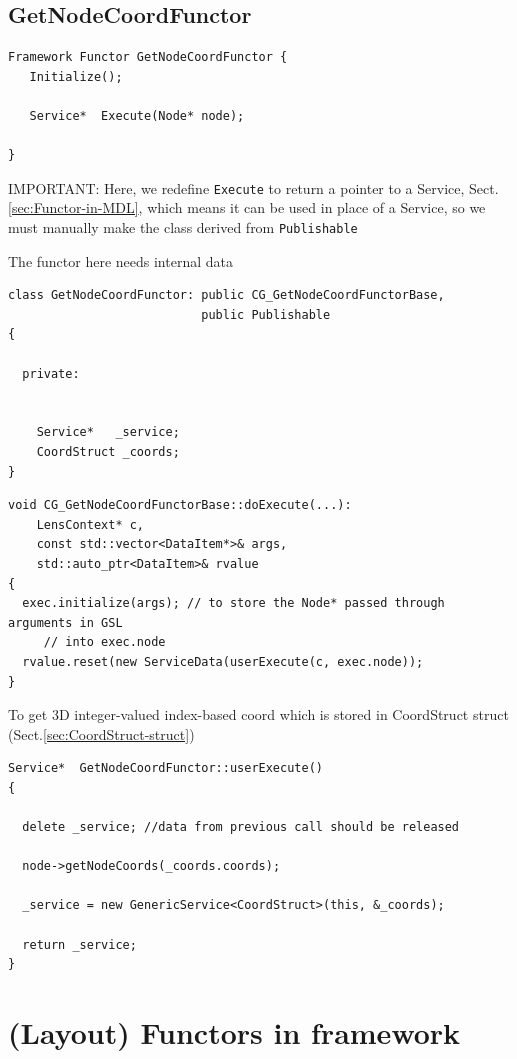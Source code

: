 \subsection{GetNodeCoordFunctor}

\begin{verbatim}
Framework Functor GetNodeCoordFunctor {
   Initialize();
   
   Service*  Execute(Node* node);

}
\end{verbatim}

IMPORTANT: Here, we redefine \verb!Execute! to return a pointer to a Service, Sect.\ref{sec:Functor-in-MDL}, which means it can be used in place of a Service,
so we must manually make the class derived from \verb!Publishable! 


The functor here needs internal data
\begin{verbatim}
class GetNodeCoordFunctor: public CG_GetNodeCoordFunctorBase,
                           public Publishable
{
  
  private:
  
  
    Service*   _service;
    CoordStruct _coords;
}
\end{verbatim}


\begin{verbatim}
void CG_GetNodeCoordFunctorBase::doExecute(...):
    LensContext* c, 
    const std::vector<DataItem*>& args,
    std::auto_ptr<DataItem>& rvalue 
{
  exec.initialize(args); // to store the Node* passed through arguments in GSL
     // into exec.node
  rvalue.reset(new ServiceData(userExecute(c, exec.node));
}
\end{verbatim}


To get 3D integer-valued index-based coord which is stored in CoordStruct struct (Sect.\ref{sec:CoordStruct-struct})
\begin{verbatim}
Service*  GetNodeCoordFunctor::userExecute()
{

  delete _service; //data from previous call should be released
  
  node->getNodeCoords(_coords.coords);
  
  _service = new GenericService<CoordStruct>(this, &_coords);
  
  return _service;
}
\end{verbatim}



\section{(Layout) Functors in framework}


